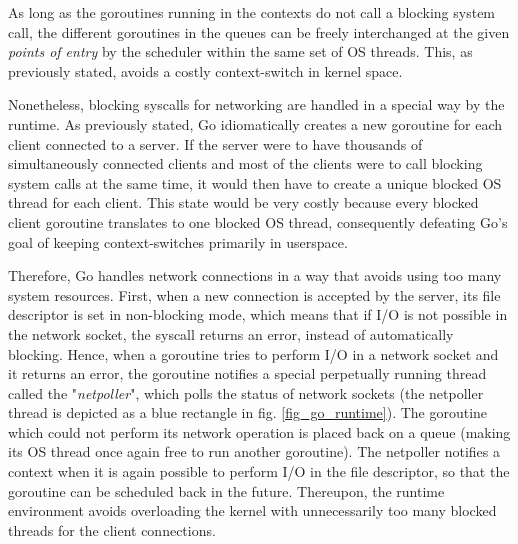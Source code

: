 As long as the goroutines running in the contexts do not call a blocking system call, the different goroutines in the queues can be freely interchanged at the given \textit{points of entry} by the scheduler within the same set of OS threads. This, as previously stated, avoids a costly context-switch in kernel space. 

Nonetheless, blocking syscalls for networking are handled in a special way by the runtime. As previously stated, Go idiomatically creates a new goroutine for each client connected to a server. If the server were to have thousands of simultaneously connected clients and most of the clients were to call blocking system calls at the same time, it would then have to create a unique blocked OS thread for each client. This state would be very costly because every blocked client goroutine translates to one blocked OS thread, consequently defeating Go's goal of keeping context-switches primarily in userspace.

Therefore, Go handles network connections in a way that avoids using too many system resources. First, when a new connection is accepted by the server, its file descriptor is set in non-blocking mode, which means that if I/O is not possible in the network socket, the syscall returns an error, instead of automatically blocking. Hence, when a goroutine tries to perform I/O in a network socket and it returns an error, the goroutine notifies a special perpetually running thread called the "\textit{netpoller}", which polls the status of network sockets \cite{Morsing2013_2} (the netpoller thread is depicted as a blue rectangle in fig. \ref{fig_go_runtime}). The goroutine which could not perform its network operation is placed back on a queue (making its OS thread once again free to run another goroutine). The netpoller notifies a context when it is again possible to perform I/O in the file descriptor, so that the goroutine can be scheduled back in the future. Thereupon, the runtime environment avoids overloading the kernel with unnecessarily too many blocked threads for the client connections.